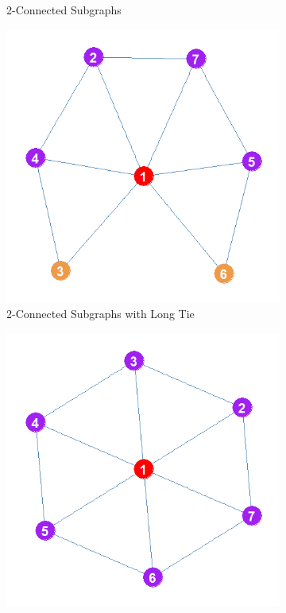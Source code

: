 \documentclass[12pt]{article}
\begin{document}
\begin{figure}
\begin{subfigure}[b]{0.35\textwidth}
            \caption{2-Connected Subgraphs}
            \label{fig:intra}
    \end{subfigure}
    \begin{subfigure}[b]{0.35\textwidth}
        \includegraphics[width=1.0\textwidth]{Plots/Toys/inter.png}
            \caption{2-Connected Subgraphs with Long Tie}
            \label{fig:inter}
    \end{subfigure}
    \begin{subfigure}[b]{0.35\textwidth}
        \includegraphics[width=1.0\textwidth]{Plots/Toys/wheel.png}

\end{subfigure}
\end{figure}
\end{document}
